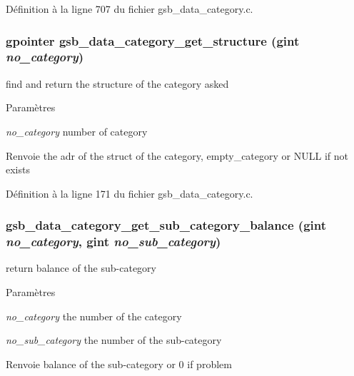 Définition à la ligne 707 du fichier gsb\_\-data\_\-category.c.

\subsubsection[{gsb\_\-data\_\-category\_\-get\_\-structure}]{\setlength{\rightskip}{0pt plus 5cm}gpointer gsb\_\-data\_\-category\_\-get\_\-structure (gint {\em no\_\-category})}\label{gsb__data__category_8h_a1ea1662771313b5e9800d380eed970d2}
find and return the structure of the category asked


\begin{DoxyParams}{Paramètres}
\item[{\em no\_\-category}]number of category\end{DoxyParams}
\begin{DoxyReturn}{Renvoie}
the adr of the struct of the category, empty\_\-category or NULL if not exists 
\end{DoxyReturn}


Définition à la ligne 171 du fichier gsb\_\-data\_\-category.c.

\subsubsection[{gsb\_\-data\_\-category\_\-get\_\-sub\_\-category\_\-balance}]{ gsb\_\-data\_\-category\_\-get\_\-sub\_\-category\_\-balance (gint {\em no\_\-category}, \/  gint {\em no\_\-sub\_\-category})}\label{gsb__data__category_8h_aeac932813d0fb3d2a96433c47f84360d}
return balance of the sub-\/category


\begin{DoxyParams}{Paramètres}
\item[{\em no\_\-category}]the number of the category \item[{\em no\_\-sub\_\-category}]the number of the sub-\/category\end{DoxyParams}
\begin{DoxyReturn}{Renvoie}
balance of the sub-\/category or 0 if problem 
\end{DoxyReturn}


